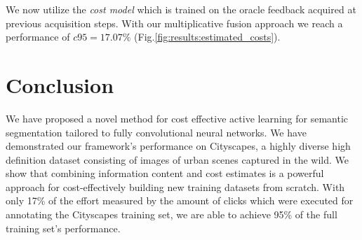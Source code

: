 \documentclass{bmvc2k}
\begin{document}
We now utilize the \textit{cost model} which is trained on the oracle feedback acquired at previous acquisition steps. With our multiplicative fusion approach we reach a performance of $c95=17.07\%$  (Fig.\ref{fig:results:estimated_costs}).

\label{sec:results}
\section{Conclusion}

We have proposed a novel method for cost effective active learning for semantic segmentation tailored to fully convolutional neural networks. We have demonstrated our framework's performance on Cityscapes, a highly diverse high definition dataset consisting of images of urban scenes captured in the wild. We show that combining information content and cost estimates is a powerful approach for cost-effectively building new training datasets from scratch. With only 17\% of the effort measured by the amount of clicks which were executed for annotating the Cityscapes training set, we are able to achieve 95\% of the full training set's performance.
\end{document}
